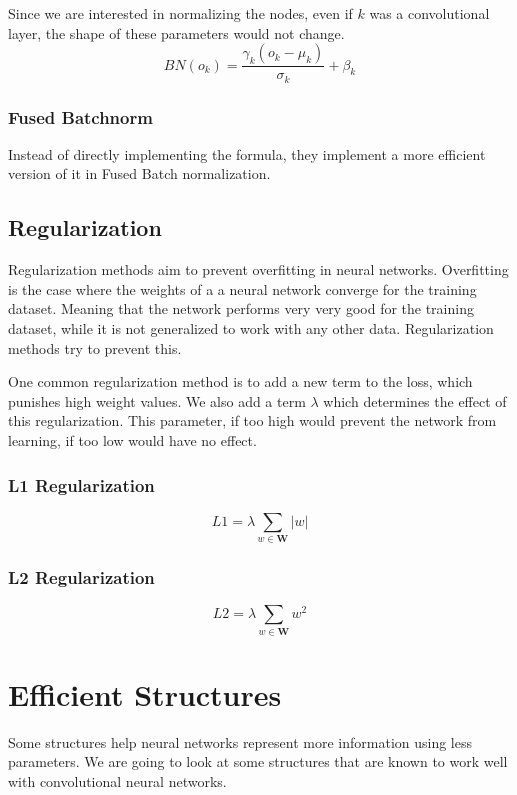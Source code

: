 Since we are interested in normalizing the nodes, even if $k$ was a convolutional layer, the shape of these parameters would not change.
$$ BN(o_k) = \frac{\gamma_k(o_k-\mu_k)}{\sigma_k}+\beta_k $$

\subsubsection{Fused Batchnorm}
Instead of directly implementing the formula, they implement a more efficient version of it in Fused Batch normalization.

\subsection{Regularization}
Regularization methods aim to prevent overfitting in neural networks. Overfitting is the case where the weights of a a neural network converge for the training dataset. Meaning that the network performs very very good for the training dataset, while it is not generalized to work with any other data. Regularization methods try to prevent this.

One common regularization method is to add a new term to the loss, which punishes high weight values. We also add a term $\lambda$ which determines the effect of this regularization. This parameter, if too high would prevent the network from learning, if too low would have no effect. 

\subsubsection{L1 Regularization}
$$ L1 = \lambda \sum_{w \in \mathbf{W}} |w| $$

\subsubsection{L2 Regularization}
$$ L2 = \lambda \sum_{w \in \mathbf{W}} w^2 $$

\section{Efficient Structures}
Some structures help neural networks represent more information using less parameters. We are going to look at some structures that are known to work well with convolutional neural networks.

\iffalse
{}
